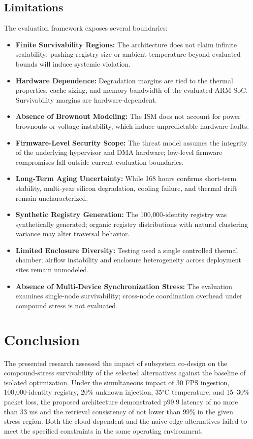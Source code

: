 \documentclass[conference]{IEEEtran}
\begin{document}
\subsection{Limitations}
The evaluation framework exposes several boundaries:
\begin{itemize}
    \item \textbf{Finite Survivability Regions:} The architecture does not claim infinite scalability; pushing registry size or ambient temperature beyond evaluated bounds will induce systemic violation.
    \item \textbf{Hardware Dependence:} Degradation margins are tied to the thermal properties, cache sizing, and memory bandwidth of the evaluated ARM SoC. Survivability margins are hardware-dependent.
    \item \textbf{Absence of Brownout Modeling:} The ISM does not account for power brownouts or voltage instability, which induce unpredictable hardware faults.
    \item \textbf{Firmware-Level Security Scope:} The threat model assumes the integrity of the underlying hypervisor and DMA hardware; low-level firmware compromises fall outside current evaluation boundaries.
    \item \textbf{Long-Term Aging Uncertainty:} While 168 hours confirms short-term stability, multi-year silicon degradation, cooling failure, and thermal drift remain uncharacterized.
    \item \textbf{Synthetic Registry Generation:} The 100,000-identity registry was synthetically generated; organic registry distributions with natural clustering variance may alter traversal behavior.
    \item \textbf{Limited Enclosure Diversity:} Testing used a single controlled thermal chamber; airflow instability and enclosure heterogeneity across deployment sites remain unmodeled.
    \item \textbf{Absence of Multi-Device Synchronization Stress:} The evaluation examines single-node survivability; cross-node coordination overhead under compound stress is not evaluated.
\end{itemize}

\section{Conclusion}

The presented research assessed the impact of subsystem co-design on the compound-stress survivability of the selected alternatives against the baseline of isolated optimization. Under the simultaneous impact of 30 FPS ingestion, 100,000-identity registry, 20\% unknown injection, 35$^\circ\text{C}$ temperature, and 15--30\% packet loss, the proposed architecture demonstrated p99.9 latency of no more than 33 ms and the retrieval consistency of not lower than 99\% in the given stress region. Both the cloud-dependent and the naive edge alternatives failed to meet the specified constraints in the same operating environment.
\end{document}
